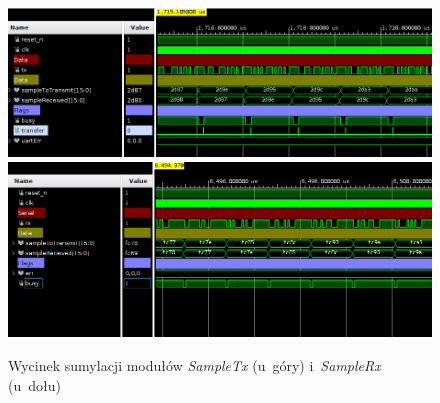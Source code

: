 \vspace{0.5cm}
\begin{figure}[ht]
    \centering
    \includegraphics[width=\textwidth]{img/sim/communication/sample_tx_sim_multiple.png}
    \includegraphics[width=\textwidth]{img/sim/communication/sample_rx_sim_multiple.png}
    \captionsetup{format=plain,justification=centering}
    \caption{Wycinek sumylacji modułów \textit{SampleTx} (u~góry) i~\textit{SampleRx} (u~dołu)}
    \label{sim-sample-trensreceiver}
\end{figure}
\vspace{0.5cm}
